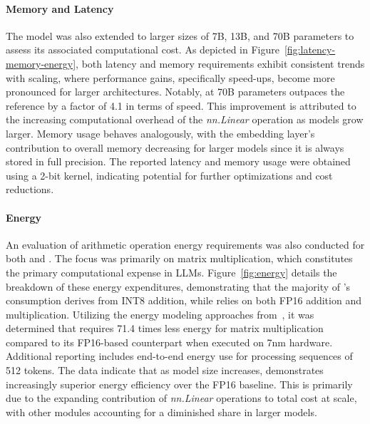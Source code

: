\paragraph{Memory and Latency}

The model was also extended to larger sizes of 7B, 13B, and 70B parameters to assess its associated computational cost. As depicted in Figure~\ref{fig:latency-memory-energy}, both latency and memory requirements exhibit consistent trends with scaling, where performance gains, specifically speed-ups, become more pronounced for larger architectures. Notably,  at 70B parameters outpaces the  reference by a factor of 4.1 in terms of speed. This improvement is attributed to the increasing computational overhead of the \emph{nn.Linear} operation as models grow larger. Memory usage behaves analogously, with the embedding layer’s contribution to overall memory decreasing for larger models since it is always stored in full precision. The reported latency and memory usage were obtained using a 2-bit kernel, indicating potential for further optimizations and cost reductions.

\paragraph{Energy}

An evaluation of arithmetic operation energy requirements was also conducted for both  and . The focus was primarily on matrix multiplication, which constitutes the primary computational expense in LLMs. Figure~\ref{fig:energy} details the breakdown of these energy expenditures, demonstrating that the majority of 's consumption derives from INT8 addition, while  relies on both FP16 addition and multiplication. Utilizing the energy modeling approaches from~\cite{energycost, pokebnn}, it was determined that  requires 71.4 times less energy for matrix multiplication compared to its FP16-based counterpart when executed on 7nm hardware. Additional reporting includes end-to-end energy use for processing sequences of 512 tokens. The data indicate that as model size increases,  demonstrates increasingly superior energy efficiency over the FP16  baseline. This is primarily due to the expanding contribution of \emph{nn.Linear} operations to total cost at scale, with other modules accounting for a diminished share in larger models.

